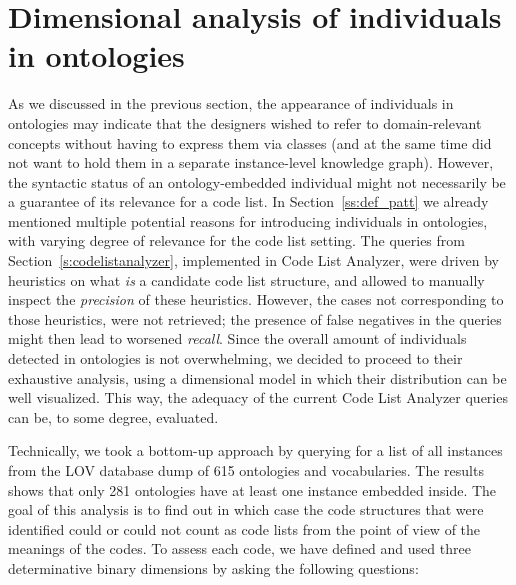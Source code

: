 





\section{Dimensional analysis of individuals in ontologies}
\label{s:analysis_code_list_modeling_practice}

As we discussed in the previous section, the appearance of individuals in ontologies may indicate that the designers wished to refer to domain-relevant concepts without having to express them via classes (and at the same time did not want to hold them in a separate instance-level knowledge graph).
However, the syntactic status of an ontology-embedded individual might not necessarily be a guarantee of its relevance for a code list. 
In Section~\ref{ss:def_patt} we already mentioned multiple potential reasons for introducing individuals in ontologies, with varying degree of relevance for the code list setting.
The queries from Section~\ref{s:codelistanalyzer}, implemented in Code List Analyzer, were driven by heuristics on what \emph{is} a candidate code list structure, and allowed to manually inspect the \emph{precision} of these heuristics.
However, the cases not corresponding to those heuristics, were not retrieved; the presence of false negatives in the queries might then lead to worsened \emph{recall}. 
Since the overall amount of individuals detected in ontologies is not overwhelming, we decided to proceed to their exhaustive analysis, using a dimensional model in which their distribution can be well visualized.
This way, the adequacy of the current Code List Analyzer queries can be, to some degree, evaluated. 

Technically, we took a bottom-up approach by querying for a list of all instances from the LOV database dump of 615 ontologies and vocabularies. The results shows that only 281 ontologies have at least one instance embedded inside. The goal of this analysis is to find out in which case the code structures that were identified could or could not count as code lists from the point of view of the meanings of the codes. To assess each code, we have defined and used three determinative binary dimensions by asking the following questions: %

